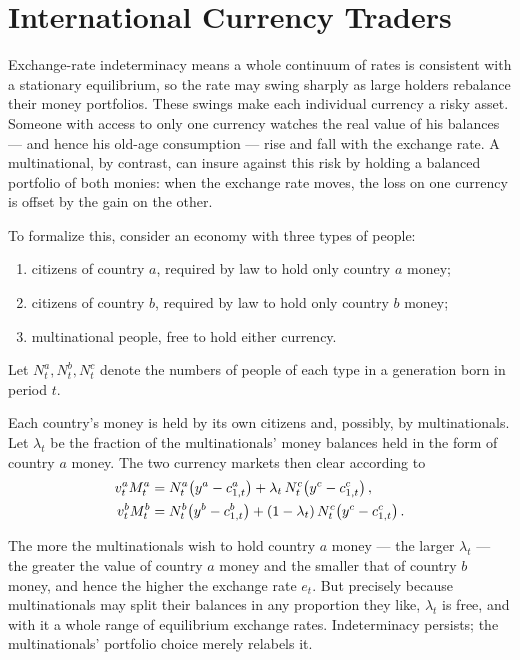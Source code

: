 
\section{International Currency Traders}

Exchange-rate indeterminacy means a whole continuum of rates is consistent with a stationary equilibrium, so the rate may swing sharply as large holders rebalance their money portfolios. These swings make each individual currency a risky asset. Someone with access to only one currency watches the real value of his balances --- and hence his old-age consumption --- rise and fall with the exchange rate. A multinational, by contrast, can insure against this risk by holding a balanced portfolio of both monies: when the exchange rate moves, the loss on one currency is offset by the gain on the other.

To formalize this, consider an economy with three types of people:
\begin{enumerate}
    \item citizens of country $a$, required by law to hold only country $a$ money;
    \item citizens of country $b$, required by law to hold only country $b$ money;
    \item multinational people, free to hold either currency.
\end{enumerate}
Let $N_t^a, N_t^b, N_t^c$ denote the numbers of people of each type in a generation born in period $t$.

Each country's money is held by its own citizens and, possibly, by multinationals. Let $\lambda_t$ be the fraction of the multinationals' money balances held in the form of country $a$ money. The two currency markets then clear according to
\[
\begin{aligned}
v_t^a M_t^a &= N_t^a\!\left(y^a - c_{1,t}^a\right) + \lambda_t\, N_t^c\!\left(y^c - c_{1,t}^c\right),\\
v_t^b M_t^b &= N_t^b\!\left(y^b - c_{1,t}^b\right) + \left(1 - \lambda_t\right) N_t^c\!\left(y^c - c_{1,t}^c\right).
\end{aligned}
\]

The more the multinationals wish to hold country $a$ money --- the larger $\lambda_t$ --- the greater the value of country $a$ money and the smaller that of country $b$ money, and hence the higher the exchange rate $e_t$. But precisely because multinationals may split their balances in any proportion they like, $\lambda_t$ is free, and with it a whole range of equilibrium exchange rates. Indeterminacy persists; the multinationals' portfolio choice merely relabels it.

